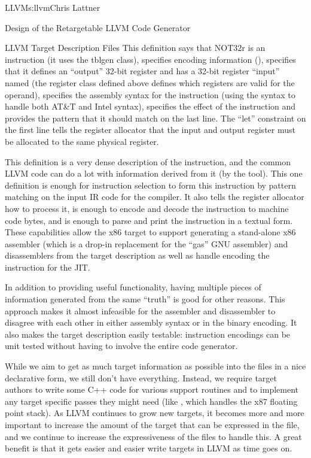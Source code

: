 \begin{aosachapter}{LLVM}{s:llvm}{Chris Lattner}
\begin{aosasect1}{Design of the Retargetable LLVM Code Generator}
\begin{aosasect2}{LLVM Target Description Files}
\noindent This definition says that NOT32r is an instruction (it uses the
 tblgen class), specifies encoding information (), specifies that it defines an ``output'' 32-bit register
 and has a 32-bit register ``input'' named 
(the  register class defined above defines which registers
are valid for the operand), specifies the assembly syntax for the
instruction (using the \code{\{\}} syntax to handle both AT\&T and
Intel syntax), specifies the effect of the instruction and provides
the pattern that it should match on the last line.  The ``let''
constraint on the first line tells the register allocator that the
input and output register must be allocated to the same physical
register.

This definition is a very dense description of the instruction, and
the common LLVM code can do a lot with information derived from it (by
the  tool).  This one definition is enough for
instruction selection to form this instruction by pattern matching on
the input IR code for the compiler.  It also tells the register allocator how
to process it, is enough to encode and decode the instruction to
machine code bytes, and is enough to parse and print the instruction
in a textual form.  These capabilities allow the x86 target to support
generating a stand-alone x86 assembler (which is a drop-in replacement
for the ``gas'' GNU assembler) and disassemblers from the target
description as well as handle encoding the instruction for the JIT.

In addition to providing useful functionality, having multiple pieces
of information generated from the same ``truth'' is good for other
reasons.  This approach makes it almost infeasible for the assembler
and disassembler to disagree with each other in either assembly syntax
or in the binary encoding.  It also makes the target description
easily testable: instruction encodings can be unit tested without
having to involve the entire code generator.

While we aim to get as much target information as possible into the
 files in a nice declarative form, we still don't have
everything. Instead, we require target authors to write some C++ code
for various support routines and to implement any target specific
passes they might need (like , which
handles the x87 floating point stack).  As LLVM continues to grow new
targets, it becomes more and more important to increase the amount of
the target that can be expressed in the  file, and we
continue to increase the expressiveness of the  files to
handle this.  A great benefit is that it gets easier and easier write
targets in LLVM as time goes on.


\end{aosasect2}
\end{aosasect1}
\end{aosachapter}
